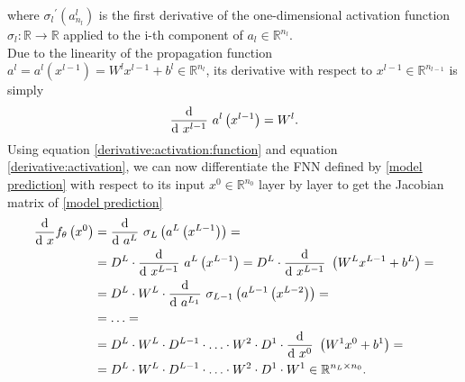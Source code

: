 where ${\sigma_{l}}^{\prime} \left( a^{l}_{n_l} \right)$ is the first derivative of the one-dimensional activation function $\sigma_{l} \colon \mathbb{R} \to \mathbb{R}$ applied to the i-th component of $a_l \in \mathbb{R}^{n_l}$. \\
Due to the linearity of the propagation function $a^l = a^l\left(x^{l-1}\right) = W^{l} x^{l-1} + b^{l} \in \mathbb{R}^{n_l}$, its derivative with respect to $x^{l-1} \in \mathbb{R}^{n_{l-1}}$ is simply
\begin{equation}
    \label{derivative:activation}
    \frac{\textup{d}}{\textup{d} \ x^{l-1}} \ a^{l}\left(x^{l-1}\right) = W^l.
\end{equation}
Using equation \cref{derivative:activation:function} and equation \cref{derivative:activation}, we can now differentiate the FNN defined by \cref{model prediction} with respect to its input $x^0 \in \mathbb{R}^{n_0}$ layer by layer to get the Jacobian matrix of \cref{model prediction}
\begin{align}
    \label{first order derivative}
    \frac{\textup{d}}{\textup{d} \ x} f_{\theta}\left(x^0\right) & = \frac{\textup{d}}{\textup{d} \ a^{L}} \ \sigma_{L} \left(a^{L}\left(x^{L-1}\right)\right) = \\
    & = D^L \cdot \frac{\textup{d}}{\textup{d} \ x^{L-1}} \ a^{L}\left(x^{L-1}\right) = D^L \cdot \frac{\textup{d}}{\textup{d} \ x^{L-1}} \ \left(W^{L} x^{L-1} + b^{L}\right) = \\
    & = D^L \cdot W^L \cdot \frac{\textup{d}}{\textup{d} \ a^{L_1}} \ \sigma_{L-1} \left(a^{L-1}\left(x^{L-2}\right)\right) = \\
    & = \ldots = \\
    & = D^L \cdot W^L \cdot D^{L-1} \cdot \ldots \cdot W^2 \cdot D^1 \cdot \frac{\textup{d}}{\textup{d} \ x^{0}} \ \left(W^{1} x^{0} + b^{1}\right) = \\
    & = D^L \cdot W^L \cdot D^{L-1} \cdot \ldots \cdot W^2 \cdot D^1 \cdot W^{1} \in \mathbb{R}^{n_L \times n_0}.
\end{align}

